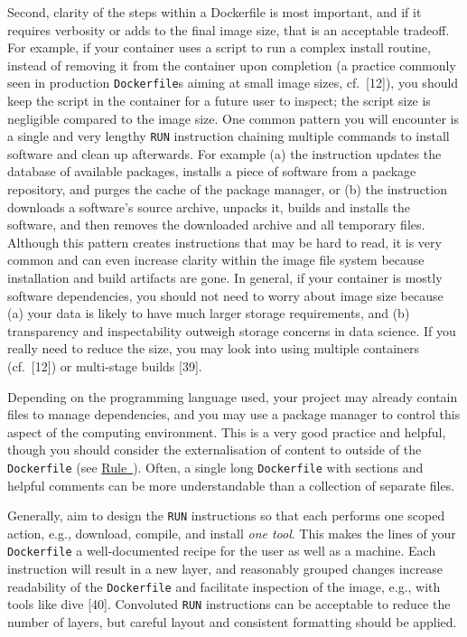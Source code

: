 \documentclass[10pt,letterpaper]{article}
\begin{document}
Second, clarity of the steps within a Dockerfile is most important, and
if it requires verbosity or adds to the final image size, that is an
acceptable tradeoff. For example, if your container uses a script to run
a complex install routine, instead of removing it from the container
upon completion (a practice commonly seen in production
\texttt{Dockerfile}s aiming at small image sizes, cf.~{[}12{]}), you
should keep the script in the container for a future user to inspect;
the script size is negligible compared to the image size. One common
pattern you will encounter is a single and very lengthy \texttt{RUN}
instruction chaining multiple commands to install software and clean up
afterwards. For example (a) the instruction updates the database of
available packages, installs a piece of software from a package
repository, and purges the cache of the package manager, or (b) the
instruction downloads a software's source archive, unpacks it, builds
and installs the software, and then removes the downloaded archive and
all temporary files. Although this pattern creates instructions that may
be hard to read, it is very common and can even increase clarity within
the image file system because installation and build artifacts are gone.
In general, if your container is mostly software dependencies, you
should not need to worry about image size because (a) your data is
likely to have much larger storage requirements, and (b) transparency
and inspectability outweigh storage concerns in data science. If you
really need to reduce the size, you may look into using multiple
containers (cf.~{[}12{]}) or multi-stage builds {[}39{]}.

Depending on the programming language used, your project may already
contain files to manage dependencies, and you may use a package manager
to control this aspect of the computing environment. This is a very good
practice and helpful, though you should consider the externalisation of
content to outside of the \texttt{Dockerfile} (see
\hyperref[{rule:mount}]{Rule~}). Often, a single
long \texttt{Dockerfile} with sections and helpful comments can be more
understandable than a collection of separate files.

Generally, aim to design the \texttt{RUN} instructions so that each
performs one scoped action, e.g., download, compile, and install
\emph{one tool}. This makes the lines of your \texttt{Dockerfile} a
well-documented recipe for the user as well as a machine. Each
instruction will result in a new layer, and reasonably grouped changes
increase readability of the \texttt{Dockerfile} and facilitate
inspection of the image, e.g., with tools like dive {[}40{]}. Convoluted
\texttt{RUN} instructions can be acceptable to reduce the number of
layers, but careful layout and consistent formatting should be applied.
\end{document}
